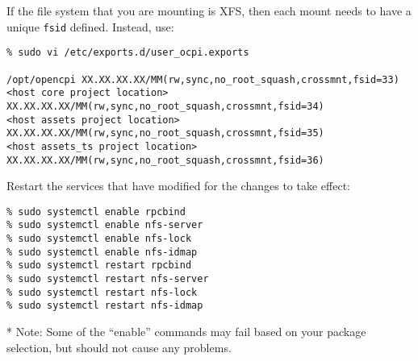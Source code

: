 If the file system that you are mounting is XFS, then each mount needs to have a unique \texttt{fsid} defined. Instead, use:
\begin{verbatim}
% sudo vi /etc/exports.d/user_ocpi.exports

/opt/opencpi XX.XX.XX.XX/MM(rw,sync,no_root_squash,crossmnt,fsid=33)
<host core project location> XX.XX.XX.XX/MM(rw,sync,no_root_squash,crossmnt,fsid=34)
<host assets project location> XX.XX.XX.XX/MM(rw,sync,no_root_squash,crossmnt,fsid=35)
<host assets_ts project location> XX.XX.XX.XX/MM(rw,sync,no_root_squash,crossmnt,fsid=36)
\end{verbatim}

Restart the services that have modified for the changes to take effect:
\begin{verbatim}
% sudo systemctl enable rpcbind
% sudo systemctl enable nfs-server
% sudo systemctl enable nfs-lock
% sudo systemctl enable nfs-idmap
% sudo systemctl restart rpcbind
% sudo systemctl restart nfs-server
% sudo systemctl restart nfs-lock
% sudo systemctl restart nfs-idmap
\end{verbatim}

* Note: Some of the ``enable'' commands may fail based on your package selection, but should not cause any problems.
\setlength{\parindent}{\savedparindentnfs}%
